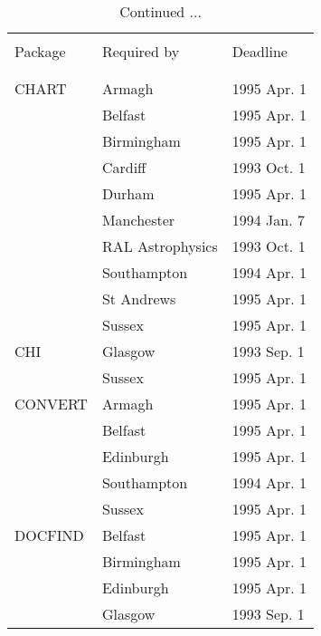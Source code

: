 \addtocounter{table}{-1}
\begin{table}
\caption{Continued ...}
\vspace{5mm}
\begin{center}
\begin{tabular}{|p{36mm}|p{50mm}|p{30mm}|} \hline
& & \\
Package & Required by & Deadline \\
& & \\ \hline
& & \\
CHART                   & Armagh           & 1995 Apr. 1 \\
                        & Belfast          & 1995 Apr. 1 \\
                        & Birmingham       & 1995 Apr. 1 \\
                        & Cardiff          & 1993 Oct. 1 \\
                        & Durham           & 1995 Apr. 1 \\
                        & Manchester       & 1994 Jan. 7 \\
                        & RAL Astrophysics & 1993 Oct. 1 \\
                        & Southampton      & 1994 Apr. 1 \\
                        & St Andrews       & 1995 Apr. 1 \\
                        & Sussex           & 1995 Apr. 1 \\
CHI                     & Glasgow          & 1993 Sep. 1 \\
                        & Sussex           & 1995 Apr. 1 \\
CONVERT                 & Armagh           & 1995 Apr. 1 \\
                        & Belfast          & 1995 Apr. 1 \\
                        & Edinburgh        & 1995 Apr. 1 \\
                        & Southampton      & 1994 Apr. 1 \\
                        & Sussex           & 1995 Apr. 1 \\
DOCFIND                 & Belfast          & 1995 Apr. 1 \\
                        & Birmingham       & 1995 Apr. 1 \\
                        & Edinburgh        & 1995 Apr. 1 \\
                        & Glasgow          & 1993 Sep. 1 \\

\end{tabular}
\end{center}
\end{table}
